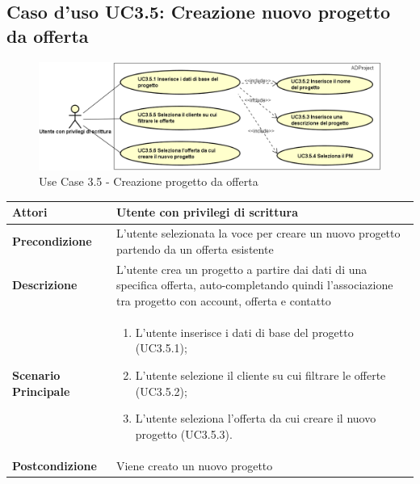 	\hypertarget{UC3.5}{}
	\subsection{Caso d'uso UC3.5: Creazione nuovo progetto da offerta}
		\begin{figure}[H]
		\centering
		\includegraphics[scale=0.55]{images/useCase/UC3_5}
		\caption{Use Case 3.5 - Creazione progetto da offerta}
		\label{fig:uc3.5}
	\end{figure}
	\begin{longtable}{ | p{2.7cm} | p{12cm} |}
		\hline \textbf{Attori} & Utente con privilegi di scrittura\\ 
		\hline \textbf{Precondizione} &  L'utente selezionata la voce per creare un nuovo progetto partendo da un offerta esistente\\ 
		\hline \textbf{Descrizione} & L'utente crea un progetto a partire dai dati di una specifica offerta, auto-completando quindi l'associazione tra progetto con account, offerta e contatto\\ 
		\hline \textbf{Scenario Principale} & \begin{enumerate}
			\itemsep-0.5em 
			\item L’utente inserisce i dati di base del progetto  (UC3.5.1);
			\item L’utente selezione il cliente su cui filtrare le offerte  (UC3.5.2);
			\item L’utente seleziona l’offerta da cui creare il nuovo progetto  (UC3.5.3).
			
		\end{enumerate}
		\\ 
		\hline \textbf{Postcondizione} & Viene creato un nuovo progetto\\ 
		\hline 
	\end{longtable}